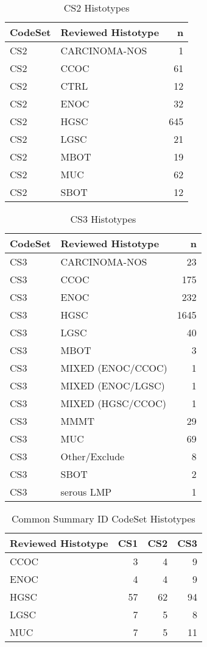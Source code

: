 \documentclass[
]{report}
\begin{document}
\begin{table}

\caption{\label{tab:dist-cs2}CS2 Histotypes}
\centering
\begin{tabular}[t]{l|l|r}
\hline
CodeSet & Reviewed Histotype & n\\
\hline
CS2 & CARCINOMA-NOS & 1\\
\hline
CS2 & CCOC & 61\\
\hline
CS2 & CTRL & 12\\
\hline
CS2 & ENOC & 32\\
\hline
CS2 & HGSC & 645\\
\hline
CS2 & LGSC & 21\\
\hline
CS2 & MBOT & 19\\
\hline
CS2 & MUC & 62\\
\hline
CS2 & SBOT & 12\\
\hline
\end{tabular}
\end{table}

\begin{table}

\caption{\label{tab:dist-cs3}CS3 Histotypes}
\centering
\begin{tabular}[t]{l|l|r}
\hline
CodeSet & Reviewed Histotype & n\\
\hline
CS3 & CARCINOMA-NOS & 23\\
\hline
CS3 & CCOC & 175\\
\hline
CS3 & ENOC & 232\\
\hline
CS3 & HGSC & 1645\\
\hline
CS3 & LGSC & 40\\
\hline
CS3 & MBOT & 3\\
\hline
CS3 & MIXED (ENOC/CCOC) & 1\\
\hline
CS3 & MIXED (ENOC/LGSC) & 1\\
\hline
CS3 & MIXED (HGSC/CCOC) & 1\\
\hline
CS3 & MMMT & 29\\
\hline
CS3 & MUC & 69\\
\hline
CS3 & Other/Exclude & 8\\
\hline
CS3 & SBOT & 2\\
\hline
CS3 & serous LMP & 1\\
\hline
\end{tabular}
\end{table}

\begin{table}

\caption{\label{tab:dist-common}Common Summary ID CodeSet Histotypes}
\centering
\begin{tabular}[t]{l|r|r|r}
\hline
Reviewed Histotype & CS1 & CS2 & CS3\\
\hline
CCOC & 3 & 4 & 9\\
\hline
ENOC & 4 & 4 & 9\\
\hline
HGSC & 57 & 62 & 94\\
\hline
LGSC & 7 & 5 & 8\\
\hline
MUC & 7 & 5 & 11\\
\hline
\end{tabular}
\end{table}
\end{document}

